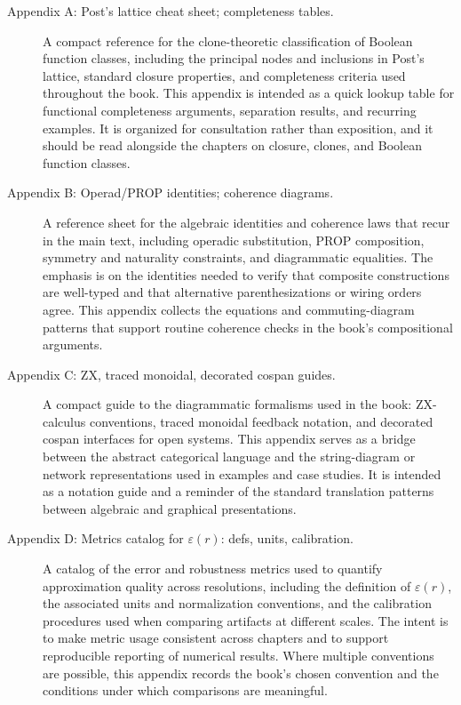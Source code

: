 \begin{description}
  \item[Appendix A: Post's lattice cheat sheet; completeness tables.] A compact reference for the clone-theoretic classification of Boolean function classes, including the principal nodes and inclusions in Post's lattice, standard closure properties, and completeness criteria used throughout the book. This appendix is intended as a quick lookup table for functional completeness arguments, separation results, and recurring examples. It is organized for consultation rather than exposition, and it should be read alongside the chapters on closure, clones, and Boolean function classes.

  \item[Appendix B: Operad/PROP identities; coherence diagrams.] A reference sheet for the algebraic identities and coherence laws that recur in the main text, including operadic substitution, PROP composition, symmetry and naturality constraints, and diagrammatic equalities. The emphasis is on the identities needed to verify that composite constructions are well-typed and that alternative parenthesizations or wiring orders agree. This appendix collects the equations and commuting-diagram patterns that support routine coherence checks in the book's compositional arguments.

  \item[Appendix C: ZX, traced monoidal, decorated cospan guides.] A compact guide to the diagrammatic formalisms used in the book: ZX-calculus conventions, traced monoidal feedback notation, and decorated cospan interfaces for open systems. This appendix serves as a bridge between the abstract categorical language and the string-diagram or network representations used in examples and case studies. It is intended as a notation guide and a reminder of the standard translation patterns between algebraic and graphical presentations.

  \item[Appendix D: Metrics catalog for \(\varepsilon(r)\): defs, units, calibration.] A catalog of the error and robustness metrics used to quantify approximation quality across resolutions, including the definition of \(\varepsilon(r)\), the associated units and normalization conventions, and the calibration procedures used when comparing artifacts at different scales. The intent is to make metric usage consistent across chapters and to support reproducible reporting of numerical results. Where multiple conventions are possible, this appendix records the book's chosen convention and the conditions under which comparisons are meaningful.
\end{description}

